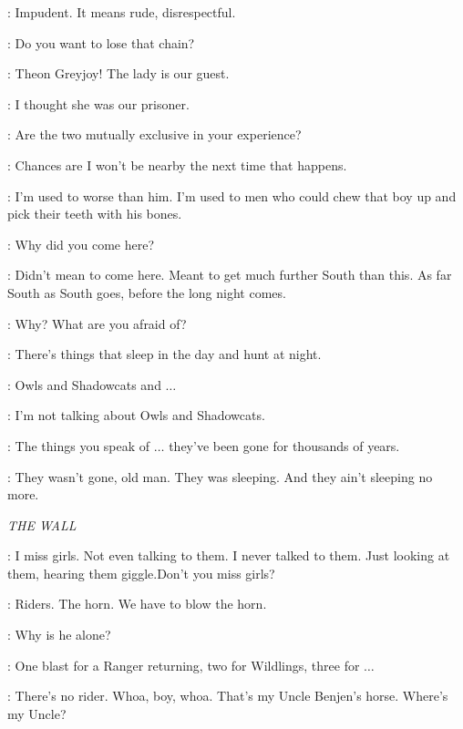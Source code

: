 \THEON: Impudent. It means rude, disrespectful. 

\THEON:  Do you want to lose that chain? 


\LUWIN: Theon Greyjoy! The lady is our guest. 

\THEON: I thought she was our prisoner. 

\LUWIN: Are the two mutually exclusive in your experience? 


\LUWIN: Chances are I won't be nearby the next time that happens. 

\OSHA: I'm used to worse than him. I'm used to men who could chew that boy up and pick their teeth with his bones. 

\LUWIN: Why did you come here? 

\OSHA: Didn't mean to come here. Meant to get much further South than this. As far South as South goes, before the long night comes. 

\LUWIN: Why? What are you afraid of? 

\OSHA: There's things that sleep in the day and hunt at night. 

\LUWIN: Owls and Shadowcats and $\ldots$  

\OSHA: I'm not talking about Owls and Shadowcats. 

\LUWIN: The things you speak of $\ldots$ they've been gone for thousands of years. 

\OSHA: They wasn't gone, old man. They was sleeping. And they ain't sleeping no more. 


\scene

\textit{THE WALL} 


\SAM: I miss girls. Not even talking to them. I never talked to them. Just looking at them, hearing them giggle.Don't you miss girls?

\SAM:  Riders.  The horn. We have to blow the horn. 

\JON: Why is he alone? 

\SAM: One blast for a Ranger returning, two for Wildlings, three for $\ldots$ 

\JON: There's no rider.  Whoa, boy, whoa. That's my Uncle Benjen's horse. Where's my Uncle? 


